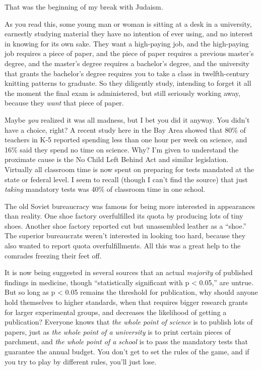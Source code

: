 {
 That was the beginning of my break with Judaism.}

{
 As you read this, some young man or woman is sitting at a desk in
a university, earnestly studying material they have no intention of
ever using, and no interest in knowing for its own sake. They want a
high-paying job, and the high-paying job requires a piece of paper, and
the piece of paper requires a previous master's degree,
and the master's degree requires a
bachelor's degree, and the university that grants the
bachelor's degree requires you to take a class in
twelfth-century knitting patterns to graduate. So they diligently
study, intending to forget it all the moment the final exam is
administered, but still seriously working away, because they
\textit{want} that piece of paper.}

{
 Maybe \textit{you} realized it was all madness, but I bet you did
it anyway. You didn't have a choice, right? A recent
study here in the Bay Area showed that 80\% of teachers in K-5 reported
spending less than one hour per week on science, and 16\% said they
spend no time on science. Why? I'm given to understand
the proximate cause is the No Child Left Behind Act and similar
legislation. Virtually all classroom time is now spent on preparing for
tests mandated at the state or federal level. I seem to recall (though
I can't find the source) that just \textit{taking}
mandatory tests was 40\% of classroom time in one school.}

{
 The old Soviet bureaucracy was famous for being more interested in
appearances than reality. One shoe factory overfulfilled its quota by
producing lots of tiny shoes. Another shoe factory reported cut but
unassembled leather as a ``shoe.''
The superior bureaucrats weren't interested in looking
too hard, because they also wanted to report quota overfulfillments.
All this was a great help to the comrades freezing their feet off.}

{
 It is now being suggested in several sources that an actual
\textit{majority} of published findings in medicine, though
``statistically significant with p {\textless}
0.05,'' are untrue. But so long as p {\textless} 0.05
remains the threshold for publication, why should anyone hold
themselves to higher standards, when that requires bigger research
grants for larger experimental groups, and decreases the likelihood of
getting a publication? Everyone knows that \textit{the whole point of
science} is to publish lots of papers, just as \textit{the whole point
of a university} is to print certain pieces of parchment, and
\textit{the whole point of a school} is to pass the mandatory tests
that guarantee the annual budget. You don't get to set
the rules of the game, and if you try to play by different rules,
you'll just lose.}

